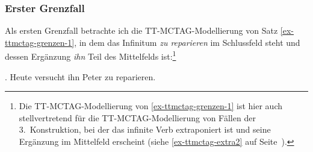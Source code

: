 \subsubsection*{Erster Grenzfall}

Als ersten Grenzfall betrachte ich die TT-MCTAG-Modellierung von Satz \ref{ex-ttmctag-grenzen-1}, in dem das Infinitum {\it zu reparieren} im Schlussfeld steht und dessen Ergänzung {\it ihn} Teil des Mittelfelds ist:\footnote{Die TT-MCTAG-Modellierung von \ref{ex-ttmctag-grenzen-1} ist hier auch stellvertretend für die TT-MCTAG-Modellierung von Fällen der 3.~Konstruktion, bei der das infinite Verb extraponiert ist und seine Ergänzung im Mittelfeld erscheint (siehe \ref{ex-ttmctag-extra2} auf Seite~\pageref{ex-ttmctag-extra2}).} 

\ex. Heute versucht ihn Peter zu reparieren. \label{ex-ttmctag-grenzen-1}

